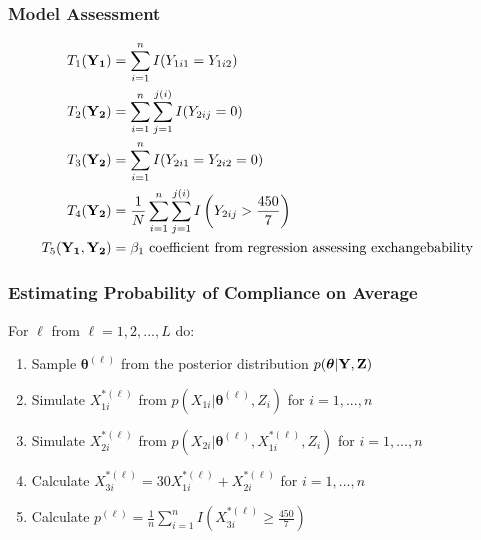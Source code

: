 \documentclass[handout]{beamer}\usepackage[]{graphicx}\usepackage[]{color}
\begin{document}
\begin{frame}
\frametitle{Model Assessment}

\begin{align*}
	T_{1}({\bf Y_1}) &=  \sum_{i=1}^{n} I(Y_{1i1} = Y_{1i2}) \\
	T_2({\bf Y_2}) &= \sum_{i=1}^{n} \sum_{j=1}^{j(i)} I(Y_{2ij} = 0) \\
	T_3({\bf Y_2}) &= \sum_{i=1}^{n}  I(Y_{2i1} = Y_{2i2} = 0) \\
	T_4({\bf Y_2}) &= \frac{1}{N} \sum_{i=1}^{n} \sum_{j=1}^{j(i)} I \left( Y_{2ij} > \frac{450}{7} \right) \\
	T_5({\bf Y_1,Y_2}) &= \beta_1 \text{ coefficient from regression assessing exchangebability } 
\end{align*}

\end{frame}


\begin{frame}
\frametitle{Estimating Probability of Compliance on Average}

For $\ell$ from $\ell=1,2,...,L$ do:
\begin{enumerate}
\item
Sample $\boldsymbol{\theta}^{(\ell)}$ from the posterior distribution $p(\boldsymbol{\theta}|{\bf Y,Z})$
\item
Simulate ${ X_{1i}^{*(\ell)}}$ from $p(X_{1i}|\boldsymbol{\theta}^{(\ell)},Z_i)$ for $i=1,...,n$
\item
Simulate ${ X_{2i}^{*(\ell)}}$ from $p(X_{2i}|\boldsymbol{\theta}^{(\ell)},X_{1i}^{*(\ell)},Z_i)$ for $i=1,...,n$
\item
Calculate $X_{3i}^{*(\ell)}= 30 X_{1i}^{*(\ell)} + X_{2i}^{*(\ell)}$ for $i=1,...,n$
\item
Calculate $p^{(\ell)} = \frac{1}{n} \sum_{i=1}^{n} I \left( X_{3i}^{*(\ell)} \geq \frac{450}{7} \right) $
\end{enumerate}

\end{frame}
\end{document}
